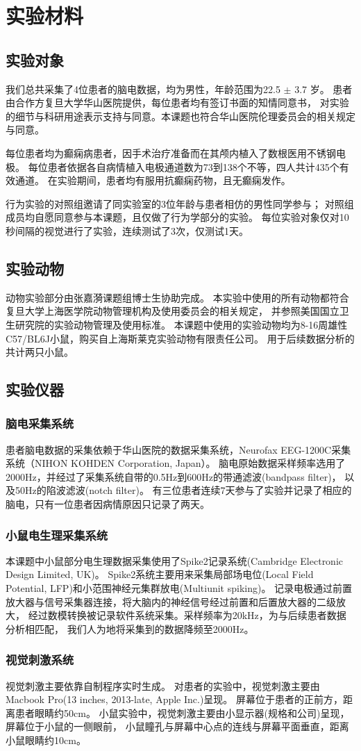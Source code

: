 \section{实验材料}

\subsection{实验对象}
我们总共采集了4位患者的脑电数据，均为男性，年龄范围为22.5 $\pm$ 3.7 岁。
患者由合作方复旦大学华山医院提供，每位患者均有签订书面的知情同意书，
对实验的细节与科研用途表示支持与同意。本课题也符合华山医院伦理委员会的相关规定与同意。

每位患者均为癫痫病患者，因手术治疗准备而在其颅内植入了数根医用不锈钢电极。
每位患者依据各自病情植入电极通道数为73到138个不等，四人共计435个有效通道。
在实验期间，患者均有服用抗癫痫药物，且无癫痫发作。

行为实验的对照组邀请了同实验室的3位年龄与患者相仿的男性同学参与；
对照组成员均自愿同意参与本课题，且仅做了行为学部分的实验。
每位实验对象仅对10秒间隔的视觉进行了实验，连续测试了3次，仅测试1天。

\subsection{实验动物}
动物实验部分由张嘉漪课题组博士生协助完成。
本实验中使用的所有动物都符合复旦大学上海医学院动物管理机构及使用委员会的相关规定，
并参照美国国立卫生研究院的实验动物管理及使用标准。
本课题中使用的实验动物均为8-16周雄性C57/BL6J小鼠，购买自上海斯莱克实验动物有限责任公司。
用于后续数据分析的共计两只小鼠。

\subsection{实验仪器}

\subsubsection{脑电采集系统}
患者脑电数据的采集依赖于华山医院的数据采集系统，Neurofax EEG-1200C采集系统（NIHON KOHDEN Corporation, Japan）。
脑电原始数据采样频率选用了2000Hz，并经过了采集系统自带的0.5Hz到600Hz的带通滤波(bandpass filter)，
以及50Hz的陷波滤波(notch filter)。
有三位患者连续7天参与了实验并记录了相应的脑电，只有一位患者因病情原因只记录了两天。

\subsubsection{小鼠电生理采集系统}
本课题中小鼠部分电生理数据采集使用了Spike2记录系统(Cambridge Electronic Design Limited, UK)。
Spike2系统主要用来采集局部场电位(Local Field Potential, LFP)和小范围神经元集群放电(Multiunit spiking)。
记录电极通过前置放大器与信号采集器连接，将大脑内的神经信号经过前置和后置放大器的二级放大，
经过数模转换被记录软件系统采集。采样频率为20kHz，为与后续患者数据分析相匹配，
我们人为地将采集到的数据降频至2000Hz。%

\subsubsection{视觉刺激系统}
视觉刺激主要依靠自制程序实时生成。
对患者的实验中，视觉刺激主要由Macbook Pro(13 inches, 2013-late, Apple Inc.)呈现。
屏幕位于患者的正前方，距离患者眼睛约50cm。
小鼠实验中，视觉刺激主要由小显示器(规格和公司)呈现，屏幕位于小鼠的一侧眼前，%
小鼠瞳孔与屏幕中心点的连线与屏幕平面垂直，距离小鼠眼睛约10cm。
